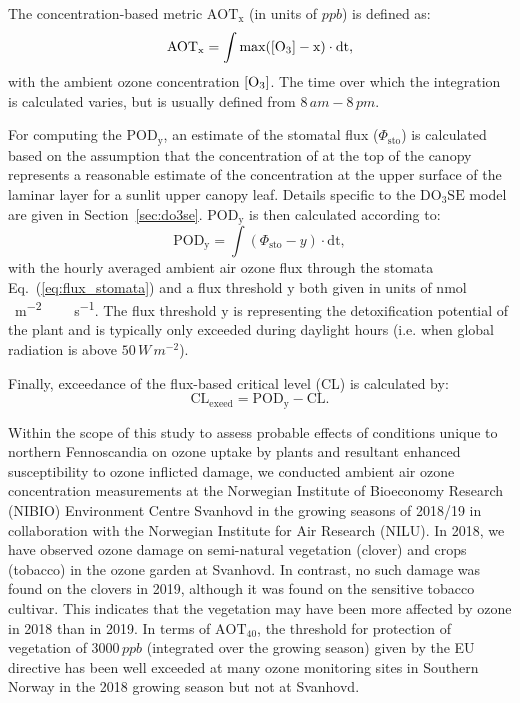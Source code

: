 \documentclass[bg, manuscript]{copernicus}
\begin{document}
The concentration-based metric $\mathrm{AOT_x}$ (in units of $\unit{ppb}$) is defined as:
\begin{equation}
  \mathrm{AOT_x} = \int{\mathrm{max(\chem{[O_3]}-x)}\cdot \mathrm{dt}},
  \label{eq:aot}
\end{equation}
with the ambient ozone concentration $\chem{[O_3]}$. The  time over which the integration is calculated varies, but is usually defined from $8\,\unit{am}-8\,\unit{pm}$.

For computing the $\mathrm{POD_y}$, an estimate of the stomatal  flux ($\Phi_\mathrm{sto}$) is calculated based on the assumption that the concentration of  at the top of the canopy represents a reasonable estimate of the concentration at the upper surface of the laminar layer for a sunlit upper canopy leaf. Details specific to the $\mathrm{DO_3SE}$ model are given in Section~\ref{sec:do3se}. $\mathrm{POD_y}$ is then calculated according to:
%
\begin{equation}
  \mathrm{POD_y} = \int{(\Phi_\mathrm{sto}-y)\cdot \mathrm{dt}},
  \label{eq:pod}
\end{equation}
%
with the hourly averaged ambient air ozone flux through the stomata Eq.~(\ref{eq:flux_stomata}) and a flux threshold $\mathrm{y}$ both given in units of \unit{nmol\,\,m^{-2}\,\,s^{-1}}. The flux threshold $\mathrm{y}$ is representing the detoxification potential of the plant and is typically only exceeded during daylight hours (i.e. when global radiation is above $50\,\unit{W\,m^{-2}}$).

Finally, exceedance of the flux-based critical level (CL) is calculated by:
%
\begin{equation}
  \mathrm{CL_{exeed}} = \mathrm{POD_y} - \mathrm{CL}.
\end{equation}
%

Within the scope of this study to assess probable effects of conditions unique to northern Fennoscandia on ozone uptake by plants and resultant enhanced susceptibility to ozone inflicted damage, we conducted ambient air ozone concentration measurements at the Norwegian Institute of Bioeconomy Research (NIBIO) Environment Centre Svanhovd in the growing seasons of 2018/19 in collaboration with the Norwegian Institute for Air Research (NILU). 
In 2018, we have observed ozone damage on semi-natural vegetation (clover) and crops (tobacco) in the ozone garden at Svanhovd. In contrast, no such damage was found on the clovers in 2019, although it was found on the sensitive tobacco cultivar. This indicates that the vegetation may have been more affected by ozone in 2018 than in 2019. In terms of $\mathrm{AOT_{40}}$, the threshold for protection of vegetation of $3000\,\unit{ppb}$ (integrated over the growing season) given by the EU directive has been well exceeded at many ozone monitoring sites in Southern Norway in the 2018 growing season \citep{NILU2019} but not at Svanhovd.
\end{document}
